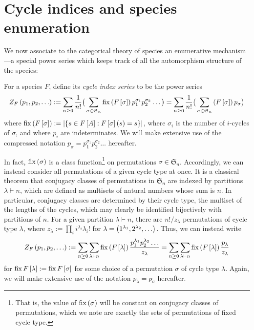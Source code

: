 \documentclass[sectionflow,singlespace,twoside,boldmathhdr]{brandiss} %
\numberwithin{section}{chapter}
\numberwithin{figure}{chapter}
\begin{document}
\section{Cycle indices and species enumeration}\label{s:cycind}
We now associate to the categorical theory of species an enumerative mechanism---a special power series which keeps track of all the automorphism structure of the species:
\begin{definition}
  \label{def:cycind}
  For a species $F$, define its \emph{cycle index series} to be the power series
  \begin{equation}
    \label{eq:cycinddef}
    Z_{F} \left( {p_{1}, p_{2}, \dots} \right) := \sum_{n \geq 0} \frac{1}{n!} \big( \sum_{\sigma \in \mathfrak{S}_{n}} \operatorname{fix} \left( {F \left[ {\sigma} \right]} \right) p_{1}^{\sigma_{1}} p_{2}^{\sigma_{2}} \dots \big) = \sum_{n \geq 0} \frac{1}{n!} \big( \sum_{\sigma \in \mathfrak{S}_{n}} \left( {F \left[ {\sigma} \right]} \right) p_{\sigma} \big)
  \end{equation}
  where $\operatorname{fix} \left( {F \left[ {\sigma} \right]} \right) := \left\vert {\ensuremath{\left\{ {s \in F \left[ {A} \right] : F \left[ {\sigma} \right] \left( {s} \right) = s} \right\}}} \right\vert$, where $\sigma_{i}$ is the number of $i$-cycles of $\sigma$, and where $p_{i}$ are indeterminates.
  We will make extensive use of the compressed notation $p_{\sigma} = p_{1}^{\sigma_{1}} p_{2}^{\sigma_{2}} \dots$ hereafter.
\end{definition}

In fact, $\operatorname{fix} \left( {\sigma} \right)$ is a class function\footnote{That is, the value of $\operatorname{fix} \left( {\sigma} \right)$ will be constant on conjugacy classes of permutations, which we note are exactly the sets of permutations of fixed cycle type.} on permutations $\sigma \in \mathfrak{S}_{n}$.
Accordingly, we can instead consider all permutations of a given cycle type at once.
It is a classical theorem that conjugacy classes of permutations in $\mathfrak{S}_{n}$ are indexed by partitions $\lambda \vdash n$, which are defined as multisets of natural numbers whose sum is $n$.
In particular, conjugacy classes are determined by their cycle type, the multiset of the lengths of the cycles, which may clearly be identified bijectively with partitions of $n$.
For a given partition $\lambda \vdash n$, there are $n! / z_{\lambda}$ permutations of cycle type $\lambda$, where $z_{\lambda} := \prod_{i} i^{\lambda_{i}} \lambda_{i}!$ for $\lambda = \left( {1^{\lambda_{1}}, 2^{\lambda_{2}}, \dots} \right)$.
Thus, we can instead write
\begin{equation}
  \label{eq:cycinddefpart}
  Z_{F} \left( {p_{1}, p_{2}, \dots} \right) := \sum_{n \geq 0} \sum_{\lambda \vdash n} \operatorname{fix} \left( {F \left[ {\lambda} \right]} \right) \frac{p_{1}^{\lambda_{1}} p_{2}^{\lambda_{2}} \dots}{z_{\lambda}} = \sum_{n \geq 0} \sum_{\lambda \vdash n} \operatorname{fix} \left( {F \left[ {\lambda} \right]} \right) \frac{p_{\lambda}}{z_{\lambda}}
\end{equation}
for $\operatorname{fix} F \left[ {\lambda} \right] := \operatorname{fix} F \left[ {\sigma} \right]$ for some choice of a permutation $\sigma$ of cycle type $\lambda$.
Again, we will make extensive use of the notation $p_{\lambda} = p_{\sigma}$ hereafter.
\end{document}
